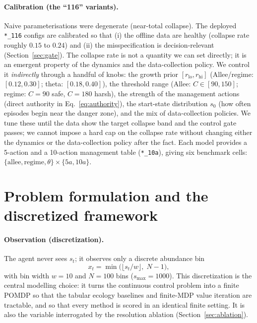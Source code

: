 \documentclass[11pt]{article}
\begin{document}
\paragraph{Calibration (the ``116'' variants).}
\label{sec:calib}
Naive parameterisations were degenerate (near-total collapse). The deployed
\texttt{*\_116} configs are calibrated so that (i) the offline data are healthy
(collapse rate roughly $0.15$ to $0.24$) and (ii) the misspecification is
decision-relevant (Section~\ref{sec:gate}). The collapse rate is not a quantity we can
set directly; it is an emergent property of the dynamics and the data-collection policy.
We control it \emph{indirectly} through a handful of knobs: the growth prior
$[r_{\text{lo}}, r_{\text{hi}}]$ (Allee/regime: $[0.12,0.30]$; theta:
$[0.18,0.40]$), the threshold range (Allee: $C\in[90,150]$; regime: $C=90$ safe,
$C=180$ harsh), the strength of the management actions (direct authority in
Eq.~\ref{eq:authority}), the start-state distribution $s_0$ (how often episodes begin
near the danger zone), and the mix of data-collection policies. We tune these until the
data show the target collapse band and the control gate passes; we cannot impose a hard
cap on the collapse rate without changing either the dynamics or the data-collection
policy after the fact. Each model provides a 5-action and a 10-action management table
(\texttt{*\_10a}), giving six benchmark cells:
$\{\text{allee},\text{regime},\theta\}\times\{5a,10a\}$.

\section{Problem formulation and the discretized framework}
\label{sec:framework}

\paragraph{Observation (discretization).} The agent never sees $s_t$; it observes only a
discrete abundance bin
\begin{equation}
x_t = \min\!\big(\lfloor s_t / w \rfloor,\; N-1\big),
\end{equation}
with bin width $w=10$ and $N=100$ bins ($s_{\max}=1000$). This discretization is the
central modelling choice: it turns the continuous control problem into a finite POMDP so
that the tabular ecology baselines and finite-MDP value iteration are tractable, and so
that every method is scored in an identical finite setting. It is also the variable
interrogated by the resolution ablation (Section~\ref{sec:ablation}).
\end{document}
